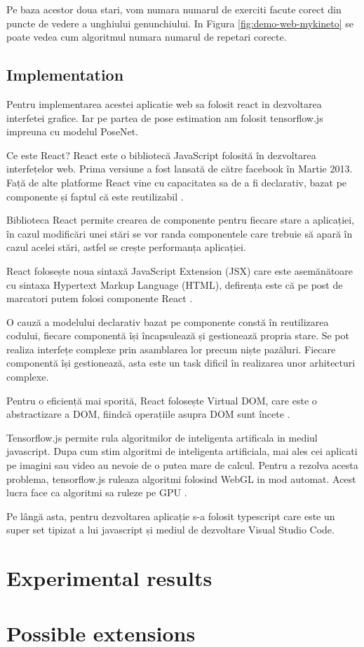 Pe baza acestor doua stari, vom numara numarul de exerciti facute corect din puncte de vedere a unghiului genunchiului.
In Figura \ref{fig:demo-web-mykineto} se poate vedea cum algoritmul numara numarul de repetari corecte.




\subsection{Implementation}

Pentru implementarea acestei aplicatie web sa folosit react in dezvoltarea interfetei grafice.
Iar pe partea de pose estimation am folosit tensorflow.js impreuna cu modelul PoseNet.

Ce este React? React este o bibliotecă JavaScript folosită în dezvoltarea interfețelor web.
Prima versiune a fost lansată de către facebook în Martie 2013. Față de alte platforme React vine cu
capacitatea sa de a fi declarativ, bazat pe componente și faptul că este reutilizabil \cite{fb-react}.

Biblioteca React permite crearea de componente pentru fiecare stare a aplicației, în cazul
modificări unei stări se vor randa componentele care trebuie să apară în cazul acelei stări, astfel se
crește performanța aplicației.

React folosește noua sintaxă JavaScript Extension (JSX) care este asemănătoare cu sintaxa
Hypertext Markup Language (HTML), defirența este că pe post de marcatori putem folosi
componente React \cite{jsx-react}.

O cauză a modelului declarativ bazat pe componente constă în reutilizarea codului, fiecare
componentă își încapsulează și gestionează propria stare. Se pot realiza interfețe complexe prin
asamblarea lor precum niște pazăluri. Fiecare componentă își gestionează, asta este un task dificil în
realizarea unor arhitecturi complexe.

Pentru o eficiență mai sporită, React folosește Virtual DOM, care este o abstractizare a
DOM, fiindcă operațiile asupra DOM sunt încete \cite{virtual-dom-react}.

Tensorflow.js permite rula algoritmilor de inteligenta artificala in mediul javascript.
Dupa cum stim algoritmi de inteligenta artificiala, mai ales cei aplicati pe imagini sau video au nevoie
de o putea mare de calcul.
Pentru a rezolva acesta problema, tensorflow.js ruleaza algoritmi folosind WebGL in mod automat.
Acest lucra face ca algoritmi sa ruleze pe GPU \cite{tensorflow.js}.


Pe lângă asta, pentru dezvoltarea aplicație s-a folosit typescript care este un super set tipizat a lui javascript și mediul de dezvoltare Visual Studio Code.


\section{Experimental results}

\section{Possible extensions}
